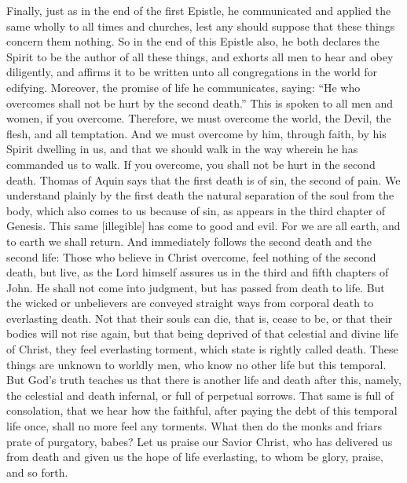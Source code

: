 Finally, just as in the end of the first Epistle, he communicated and applied the same wholly to all times and churches, lest any should suppose that these things concern them nothing. So in the end of this Epistle also, he both declares the Spirit to be the author of all these things, and exhorts all men to hear and obey diligently, and affirms it to be written unto all congregations in the world for edifying. Moreover, the promise of life he communicates, saying: “He who overcomes shall not be hurt by the second death.” This is spoken to all men and women, if you overcome. Therefore, we must overcome the world, the Devil, the flesh, and all temptation. And we must overcome by him, through faith, by his Spirit dwelling in us, and that we should walk in the way wherein he has commanded us to walk. If you overcome, you shall not be hurt in the second death. Thomas of Aquin says that the first death is of sin, the second of pain. We understand plainly by the first death the natural separation of the soul from the body, which also comes to us because of sin, as appears in the third chapter of Genesis. This same [illegible] has come to good and evil. For we are all earth, and to earth we shall return. And immediately follows the second death and the second life: Those who believe in Christ overcome, feel nothing of the second death, but live, as the Lord himself assures us in the third and fifth chapters of John. He shall not come into judgment, but has passed from death to life. But the wicked or unbelievers are conveyed straight ways from corporal death to everlasting death. Not that their souls can die, that is, cease to be, or that their bodies will not rise again, but that being deprived of that celestial and divine life of Christ, they feel everlasting torment, which state is rightly called death. These things are unknown to worldly men, who know no other life but this temporal. But God’s truth teaches us that there is another life and death after this, namely, the celestial and death infernal, or full of perpetual sorrows. That same is full of consolation, that we hear how the faithful, after paying the debt of this temporal life once, shall no more feel any torments. What then do the monks and friars prate of purgatory, babes? Let us praise our Savior Christ, who has delivered us from death and given us the hope of life everlasting, to whom be glory, praise, and so forth.
